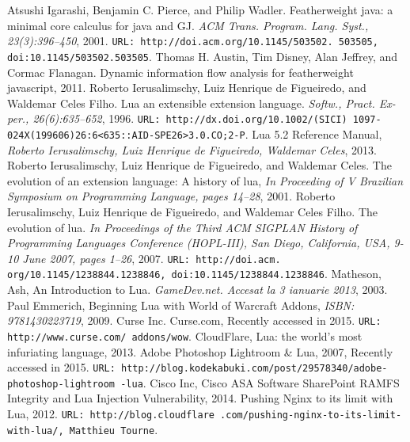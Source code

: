 \begin{thebibliography}{10}
\addtolength{\leftmargin}{0.2in} %
\setlength{\itemindent}{-0.2in}

 Atsushi Igarashi, Benjamin C. Pierce, and Philip Wadler. Featherweight java: a minimal core calculus for java and GJ. {\it ACM Trans. Program. Lang. Syst., 23(3):396–450}, 2001. {\tt URL: http://doi.acm.org/10.1145/503502. 503505, doi:10.1145/503502.503505}.
 Thomas H. Austin, Tim Disney, Alan Jeffrey, and Cormac Flanagan. Dynamic information flow analysis for featherweight javascript, 2011.
 Roberto Ierusalimschy, Luiz Henrique de Figueiredo, and Waldemar Celes Filho. Lua an extensible extension language. {\it Softw., Pract. Ex- per., 26(6):635–652}, 1996. {\tt URL: http://dx.doi.org/10.1002/(SICI) 1097-024X(199606)26:6<635::AID-SPE26>3.0.CO;2-P}.
 Lua 5.2 Reference Manual, {\it Roberto Ierusalimschy, Luiz Henrique de Figueiredo, Waldemar Celes}, 2013.
 Roberto Ierusalimschy, Luiz Henrique de Figueiredo, and Waldemar Celes. The evolution of an extension language: A history of lua, {\it In Proceeding of V Brazilian Symposium on Programming Language, pages 14–28}, 2001.
 Roberto Ierusalimschy, Luiz Henrique de Figueiredo, and Waldemar Celes Filho. The evolution of lua. {\it In Proceedings of the Third ACM SIGPLAN History of Programming Languages Conference (HOPL-III), San Diego, California, USA, 9-10 June 2007, pages 1–26}, 2007. {\tt URL: http://doi.acm. org/10.1145/1238844.1238846, doi:10.1145/1238844.1238846}.
 Matheson, Ash, An Introduction to Lua. {\it GameDev.net. Accesat la 3 ianuarie 2013}, 2003.
 Paul Emmerich, Beginning Lua with World of Warcraft Addons, {\it ISBN: 9781430223719}, 2009.
 Curse Inc. Curse.com, Recently accessed in 2015. {\tt URL: http://www.curse.com/
addons/wow}.
 CloudFlare, Lua: the world's most infuriating language, 2013.
 Adobe Photoshop Lightroom \& Lua, 2007, Recently accessed in 2015. {\tt URL: http://blog.kodekabuki.com/post/29578340/adobe-photoshop-lightroom
-lua}.
 Cisco Inc, Cisco ASA Software SharePoint RAMFS Integrity and Lua Injection Vulnerability, 2014.
 Pushing Nginx to its limit with Lua, 2012. {\tt URL: http://blog.cloudflare
.com/pushing-nginx-to-its-limit-with-lua/, Matthieu Tourne}.


\end{thebibliography}
